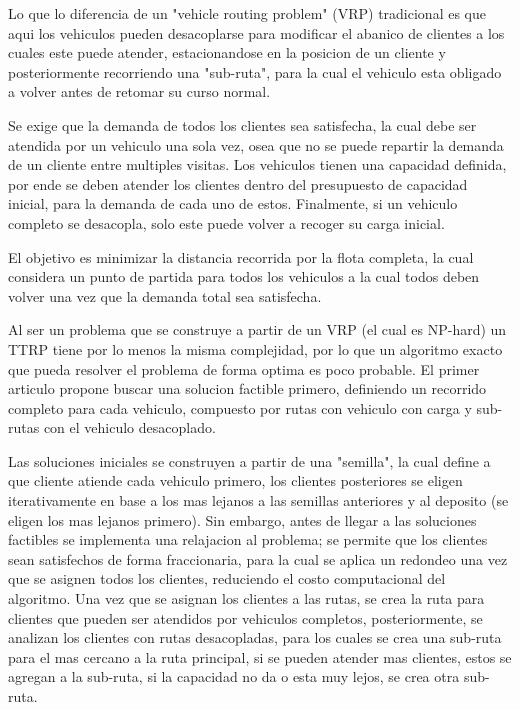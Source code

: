 \documentclass[letter, 10pt]{article}
\begin{document}
Lo que lo diferencia de un "vehicle routing problem" (VRP) tradicional es que aqui los vehiculos pueden desacoplarse para modificar el
abanico de clientes a los cuales este puede atender, estacionandose en la posicion de un cliente y posteriormente recorriendo una "sub-ruta",
para la cual el vehiculo esta obligado a volver antes de retomar su curso normal.

Se exige que la demanda de todos los clientes sea satisfecha, la cual debe ser atendida por un vehiculo una sola vez, osea que no se puede
repartir la demanda de un cliente entre multiples visitas. Los vehiculos tienen una capacidad definida, por ende se deben atender los clientes
dentro del presupuesto de capacidad inicial, para la demanda de cada uno de estos. Finalmente, si un vehiculo completo se desacopla, solo este
puede volver a recoger su carga inicial.

El objetivo es minimizar la distancia recorrida por la flota completa, la cual considera un punto de partida para todos los vehiculos a la cual
todos deben volver una vez que la demanda total sea satisfecha.

Al ser un problema que se construye a partir de un VRP (el cual es NP-hard) un TTRP tiene por lo menos la misma complejidad, por lo que un
algoritmo exacto que pueda resolver el problema de forma optima es poco probable. El primer articulo propone buscar una solucion factible
primero, definiendo un recorrido completo para cada vehiculo, compuesto por rutas con vehiculo con carga y sub-rutas con el vehiculo
desacoplado.

Las soluciones iniciales se construyen a partir de una "semilla", la cual define a que cliente atiende cada vehiculo primero,
los clientes posteriores se eligen iterativamente en base a los mas lejanos a las semillas anteriores y al deposito (se eligen los mas lejanos
primero). Sin embargo, antes de llegar a las soluciones factibles se implementa una relajacion al problema; se permite que los clientes sean
satisfechos de forma fraccionaria, para la cual se aplica un redondeo una vez que se asignen todos los clientes, reduciendo el costo computacional
del algoritmo. Una vez que se asignan los clientes a las rutas, se crea la ruta para clientes que pueden ser atendidos por vehiculos completos,
posteriormente, se analizan los clientes con rutas desacopladas, para los cuales se crea una sub-ruta para el mas cercano a la ruta principal,
si se pueden atender mas clientes, estos se agregan a la sub-ruta, si la capacidad no da o esta muy lejos, se crea otra sub-ruta.
\end{document}
